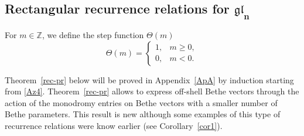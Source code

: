 \documentclass[10pt,a4paper]{amsart}
\theoremstyle{definition}
\def\ZZ{{\mathbb Z}}
\begin{document}
\subsection[Rectangular recurrence relations for gl\_n]{Rectangular recurrence relations for $\boldsymbol{\mathfrak{gl}_n}$}

For $m\in\ZZ$, we define the step function $\Theta(m)$
\[%
\Theta(m)=\begin{cases}1,& m\geq 0,\\ 0,&  m<0.
\end{cases}
\]

Theorem~\ref{rec-pr} below will be proved in Appendix~\ref{ApA} by induction starting from \eqref{Az4}. Theorem~\ref{rec-pr} allows to express
off-shell Bethe vectors through the action of the monodromy entries on Bethe
vectors with a smaller number of Bethe parameters. This result is new
although some examples of this type of recurrence relations were know earlier
(see Corollary~\ref{cor1}).
\end{document}
